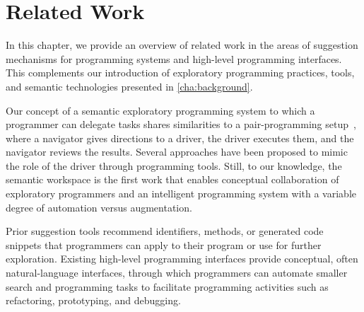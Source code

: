
\chapter{Related Work}
\label{cha:related_work}

In this chapter, we provide an overview of related work in the areas of suggestion mechanisms for programming systems and high-level programming interfaces.
This complements our introduction of exploratory programming practices, tools, and semantic technologies presented in \cref{cha:background}.

Our concept of a semantic exploratory programming system to which a programmer can delegate tasks shares similarities to a pair-programming setup~\cite{beck2000extreme}, where a navigator gives directions to a driver, the driver executes them, and the navigator reviews the results.
Several approaches have been proposed to mimic the role of the driver through programming tools.
Still, to our knowledge, the semantic workspace is the first work that enables conceptual collaboration of exploratory programmers and an intelligent programming system with a variable degree of automation versus augmentation.


\begin{summary}
	Prior suggestion tools recommend identifiers, methods, or generated code snippets that programmers can apply to their program or use for further exploration.
	Existing high-level programming interfaces provide conceptual, often natural-language interfaces, through which programmers can automate smaller search and programming tasks to facilitate programming activities such as refactoring, prototyping, and debugging.
\end{summary}

